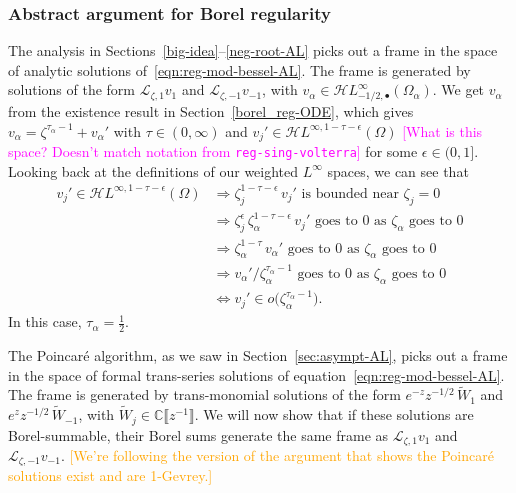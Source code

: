 \documentclass{article}
\newcommand{\singexp}[2]{\mathcal{H}L^\infty_{#1, #2}}
\newcommand{\singexpalg}[1]{\singexp{#1}{\bullet}}
\newcommand{\holoL}[1]{\mathcal{H}L^{#1}} %
\newcommand{\C}{\mathbb{C}}
\newcommand{\laplace}{\mathcal{L}}
\theoremstyle{definition}
\theoremstyle{plain}
\newenvironment{verify}{\color{ForestGreen}}{\color{black}}
\begin{document}
\subsubsection{Abstract argument for Borel regularity}\label{bessel-regularity-AL}
The analysis in Sections~\ref{big-idea}--\ref{neg-root-AL} picks out a frame in the space of analytic solutions of~\eqref{eqn:reg-mod-bessel-AL}. The frame is generated by solutions of the form $\laplace_{\zeta, 1} v_1$ and $\laplace_{\zeta, -1} v_{-1}$, with $v_\alpha \in \singexpalg{-1/2}(\Omega_\alpha)$.
\begin{verify}
We get $v_\alpha$ from the existence result in Section~\ref{borel_reg-ODE}, which gives $v_\alpha = \zeta^{\tau_\alpha-1} + v_\alpha'$ with $\tau \in (0, \infty)$ and $v_j' \in \holoL{\infty, 1-\tau-\epsilon}(\Omega)$ \textcolor{magenta}{[What is this space? Doesn't match notation from {\tt reg-sing-volterra}]} for some $\epsilon \in (0, 1]$. Looking back at the definitions of our weighted $L^\infty$ spaces, we can see that
\begin{align*}
v_j' \in \holoL{\infty, 1-\tau-\epsilon}(\Omega) & \Longrightarrow \zeta_j^{1-\tau-\epsilon}\,v_j' \text{ is bounded near } \zeta_j = 0 \\
& \Longrightarrow \zeta_j^\epsilon\,\zeta_\alpha^{1-\tau-\epsilon}\,v_j' \text{ goes to } 0 \text{ as } \zeta_\alpha \text{ goes to } 0 \\
& \Longrightarrow \zeta_\alpha^{1-\tau}\,v_\alpha' \text{ goes to } 0 \text{ as } \zeta_\alpha \text{ goes to } 0 \\
& \Longrightarrow v_\alpha' / \zeta_\alpha^{\tau_\alpha-1} \text{ goes to } 0 \text{ as } \zeta_\alpha \text{ goes to } 0 \\
& \Longleftrightarrow v_j' \in o\big(\zeta_\alpha^{\tau_\alpha-1}\big).
\end{align*}
In this case, $\tau_\alpha = \tfrac{1}{2}$.
\end{verify}

The Poincar\'{e} algorithm, as we saw in Section~\ref{sec:asympt-AL}, picks out a frame in the space of formal trans-series solutions of equation~\eqref{eqn:reg-mod-bessel-AL}. The frame is generated by trans-monomial solutions of the form $e^{-z} z^{-1/2}\,\tilde{W}_1$ and $e^z z^{-1/2}\,\tilde{W}_{-1}$, with $\tilde{W}_j \in \C\llbracket z^{-1} \rrbracket$. We will now show that if these solutions are Borel-summable, their Borel sums generate the same frame as $\laplace_{\zeta, 1} v_1$ and $\laplace_{\zeta, -1} v_{-1}$. \textcolor{orange}{[We're following the version of the argument that shows the Poincar\'{e} solutions exist and are 1-Gevrey.]}
\end{document}

